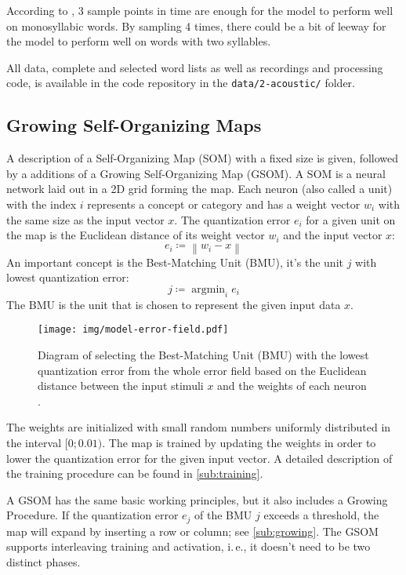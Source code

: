 \documentclass[twocolumn]{article}
\DeclareMathOperator*{\argmin}{argmin}
\newcommand{\norm}[1]{\left\lVert #1 \right\rVert}
\begin{document}
According to \textcite{mayor_neurocomputational_2010}, 3 sample points in time are enough for the model to perform well on monosyllabic words. By sampling 4 times, there could be a bit of leeway for the model to perform well on words with two syllables.

All data, complete and selected word lists as well as recordings and processing code, is available in the code repository in the \texttt{data/2-acoustic/} folder.

\subsection{Growing Self-Organizing Maps} \label{sub:gsom}
A description of a Self-Organizing Map (SOM) with a fixed size is given, followed by a additions of a Growing Self-Organizing Map (GSOM). A SOM is a neural network laid out in a 2D grid forming the map. Each neuron (also called a unit) with the index $i$ represents a concept or category and has a weight vector $w_i$ with the same size as the input vector $x$. The quantization error $e_i$ for a given unit on the map is the Euclidean distance of its weight vector $w_i$ and the input vector $x$: \[
e_i \coloneq \norm{w_i - x}
\]
An important concept is the Best-Matching Unit (BMU), it's the unit $j$ with lowest quantization error: \[
j \coloneq \argmin_{i} {e_i}
\]
The BMU is the unit that is chosen to represent the given input data $x$.

\begin{figure}[ht]
\centering
\texttt{[image: img/model-error-field.pdf]}
\caption{Diagram of selecting the Best-Matching Unit (BMU) with the lowest quantization error from the whole error field based on the Euclidean distance between the input stimuli $x$ and the weights of each neuron \parencite{walling_visual_2018}.}
\end{figure}

The weights are initialized with small random numbers uniformly distributed in the interval $[0; 0.01)$. The map is trained by updating the weights in order to lower the quantization error for the given input vector. A detailed description of the training procedure can be found in \autoref{sub:training}.

A GSOM has the same basic working principles, but it also includes a Growing Procedure. If the quantization error $e_j$ of the BMU $j$ exceeds a threshold, the map will expand by inserting a row or column; see \autoref{sub:growing}. The GSOM supports interleaving training and activation, i.\,e., it doesn't need to be two distinct phases.
\end{document}
